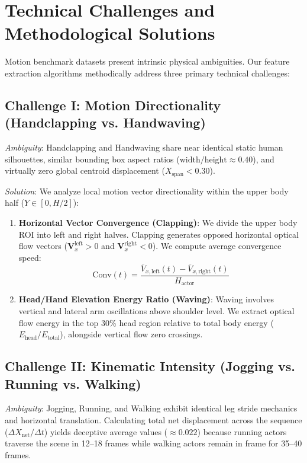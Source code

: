 \documentclass[11pt,a4paper]{article}
\begin{document}
\section{Technical Challenges and Methodological Solutions}
Motion benchmark datasets present intrinsic physical ambiguities. Our feature extraction algorithms methodically address three primary technical challenges:

\subsection{Challenge I: Motion Directionality (Handclapping vs. Handwaving)}
\textit{Ambiguity}: Handclapping and Handwaving share near identical static human silhouettes, similar bounding box aspect ratios ($\text{width}/\text{height} \approx 0.40$), and virtually zero global centroid displacement ($X_{\text{span}} < 0.30$).

\textit{Solution}: We analyze local motion vector directionality within the upper body half ($Y \in [0, H/2]$):
\begin{enumerate}
    \item \textbf{Horizontal Vector Convergence (Clapping)}: We divide the upper body ROI into left and right halves. Clapping generates opposed horizontal optical flow vectors ($\mathbf{V}_x^{\text{left}} > 0$ and $\mathbf{V}_x^{\text{right}} < 0$). We compute average convergence speed:
    \begin{equation}
        \text{Conv}(t) = \frac{\bar{V}_{x,\text{left}}(t) - \bar{V}_{x,\text{right}}(t)}{H_{\text{actor}}}
    \end{equation}
    \item \textbf{Head/Hand Elevation Energy Ratio (Waving)}: Waving involves vertical and lateral arm oscillations above shoulder level. We extract optical flow energy in the top 30\% head region relative to total body energy ($E_{\text{head}} / E_{\text{total}}$), alongside vertical flow zero crossings.
\end{enumerate}

\subsection{Challenge II: Kinematic Intensity (Jogging vs. Running vs. Walking)}
\textit{Ambiguity}: Jogging, Running, and Walking exhibit identical leg stride mechanics and horizontal translation. Calculating total net displacement across the sequence ($\Delta X_{\text{net}} / \Delta t$) yields deceptive average values ($\approx 0.022$) because running actors traverse the scene in 12--18 frames while walking actors remain in frame for 35--40 frames.
\end{document}
